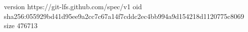 version https://git-lfs.github.com/spec/v1
oid sha256:055929bd41d95ee9a2cc7c67a14f7cddc2ec4bb994a9d154218d1120775c8069
size 476713
